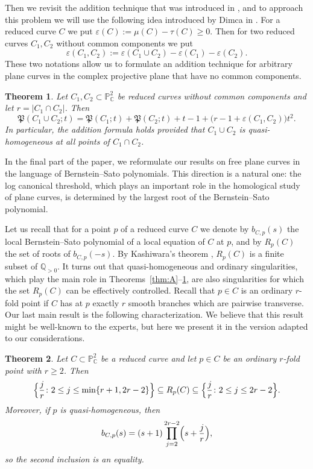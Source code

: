 \documentclass[11pt]{amsart}
\newtheorem{theorem}{Theorem}[section]
\theoremstyle{definition}
\numberwithin{equation}{section}
\newcommand{\PP}{\mathbb{P}}
\newcommand{\CC}{\mathbb{C}}
\newcommand{\QQ}{\mathbb{Q}}
\newcommand{\Pfrak}{\mathfrak{P}}
\newcommand{\gadd}[1]{#1}
\begin{document}
Then we revisit the addition technique that was introduced in \cite{Po24}, and to approach this problem we will use the following idea introduced by Dimca in \cite{Di24}. For a reduced curve $C$ we put $\varepsilon(C) :=\mu(C)-\tau(C)\ge0$.
Then for two reduced curves $C_1,C_2$ without common components we put 
\[
\varepsilon(C_1,C_2) := \varepsilon(C_1\cup C_2)-\varepsilon(C_1)-\varepsilon(C_2).
\]
These two notations allow us to formulate an addition technique for arbitrary plane curves in the complex projective plane that have no common components.
\begin{theorem}\label{thm:C}
Let $C_1,C_2\subset\PP^2_\CC$ be reduced curves without common components and let $r=|C_1\cap C_2|$. Then
\[
\Pfrak(C_1\cup C_2;t)=\Pfrak(C_1;t)+\Pfrak(C_2;t)+t-1+\bigl(r-1+\varepsilon(C_1,C_2)\bigr)t^2 .
\]
In particular, the addition formula \cite[Theorem~1.2]{Po24} holds provided that $C_1\cup C_2$ is quasi-homogeneous at all points of $C_1\cap C_2$.
\end{theorem}

In the final part of the paper, we reformulate our results on free plane curves in the language of Bernstein–Sato polynomials. This direction is a natural one: the log canonical threshold, which plays an important role in the homological study of plane curves, is determined by the largest root of the Bernstein–Sato polynomial.

Let us recall that for a point $p$ of a reduced curve $C$ we denote by $b_{C,p}(s)$ the local Bernstein--Sato polynomial of a local equation of $C$ at $p$, and by $R_p(C)$ the set of roots of $b_{C,p}(-s)$.
By Kashiwara's theorem \cite{Ka}, $R_p(C)$ is a finite subset of $\QQ_{>0}$.
It turns out that quasi-homogeneous and ordinary singularities, which play the main role in Theorems~\ref{thm:A}--\ref{thm:C}, are also singularities for which the set $R_p(C)$ can be effectively controlled.
Recall that $p\in C$ is an ordinary $r$-fold point if $C$ has at $p$ exactly $r$ smooth branches which are pairwise transverse.
Our last main result is the following characterization. We believe that this result might be well-known to the experts, but here we present it in the version adapted to our considerations.

\begin{theorem}\label{thm:D}
Let $C\subset\PP^2_\CC$ be a reduced curve and let $p\in C$ be an ordinary $r$-fold point with $r\ge2$. Then
\[
\Bigl\{\frac jr\colon 2\le j\le \gadd{\min\{r+1,2r-2\}}\Bigr\}\subseteq R_p(C)\subseteq\Bigl\{\frac jr\colon 2\le j\le 2r-2\Bigr\}.
\]
Moreover, if $p$ is quasi-homogeneous, then
\[
b_{C,p}(s)=(s+1)\prod_{j=2}^{2r-2}\Bigl(s+\frac jr\Bigr),
\]
so the second inclusion is an equality.
\end{theorem}
\end{document}
